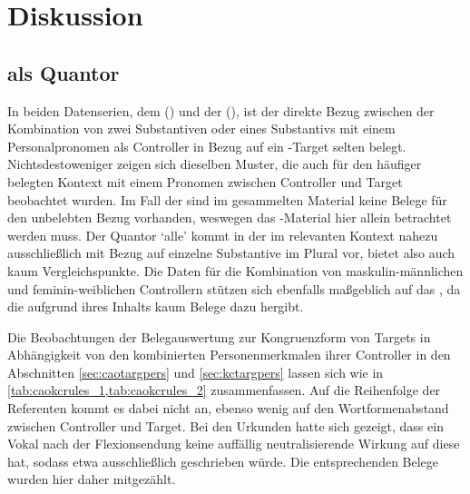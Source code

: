 \chapter{Diskussion}
\label{ch:diskussion}

\section{ als Quantor}

In beiden Datenserien, dem 
(\CAO{}) und der  (\KC{}), ist der direkte Bezug zwischen
der Kombination von zwei Substantiven oder eines Substantivs mit einem
Personalpronomen als Controller in Bezug auf ein -Target selten
belegt. Nichtsdestoweniger zeigen sich dieselben Muster, die auch für den
häufiger belegten Kontext mit einem Pronomen zwischen Controller und Target
beobachtet wurden. Im Fall der \KC{} sind im gesammelten Material %
keine Belege für den unbelebten Bezug vorhanden, weswegen das
\CAO{}-Material hier allein betrachtet werden muss. Der Quantor
 `alle' \autocite[vgl.][606--621]{ksw2} kommt in der \KC{}
im relevanten Kontext nahezu ausschließlich mit Bezug auf einzelne
Substan\-tive im Plural vor, bietet also auch kaum Vergleichspunkte. Die Daten
für die Kombination von maskulin-männlichen und feminin-weiblichen Controllern
stützen sich ebenfalls maßgeblich auf das \CAO{}, da die \KC{}
aufgrund ihres Inhalts kaum Belege dazu hergibt.

Die Beobachtungen der Belegauswertung zur Kongruenzform von Targets in
Abhängigkeit von den kombinierten Personenmerkmalen ihrer Controller in den
Abschnitten \ref{sec:caotargpers} und \ref{sec:kctargpers} lassen sich wie in
\cref{tab:caokcrules_1,tab:caokcrules_2} zusammenfassen. Auf die Reihenfolge
der Referenten kommt es dabei nicht an, ebenso wenig auf den Wortformenabstand
zwischen Controller und Target. Bei den Urkunden hatte sich gezeigt, dass ein
Vokal nach der Flexionsendung  keine auffällig
neutrali\-sie\-rende Wirkung auf diese hat, sodass etwa ausschließlich 
geschrieben würde. Die entsprechenden Belege wurden hier daher mitgezählt.

